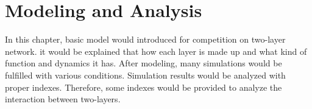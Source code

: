 
\chapter{Modeling and Analysis}
\label{chap:modeling and analysis methods}
In this chapter, basic model would introduced for competition on two-layer network. it would be explained that how each layer is made up and what kind of function and dynamics it has. After modeling, many simulations would be fulfilled with various conditions. Simulation results would be analyzed with proper indexes. Therefore, some indexes would be provided to analyze the interaction between two-layers. 
 

